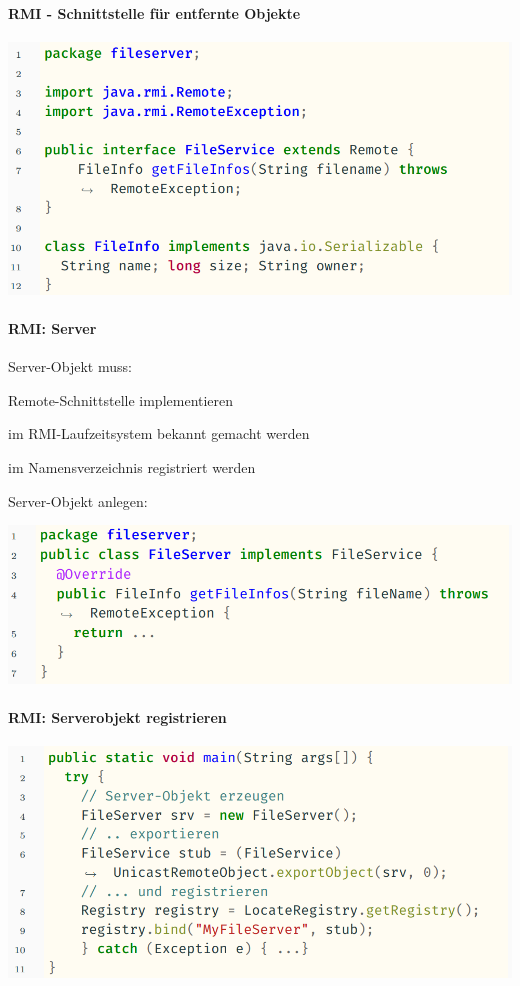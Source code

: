 \documentclass[10pt]{article}
\begin{document}
\paragraph{RMI - Schnittstelle für entfernte Objekte}

\begin{center}
  \includegraphics[width=0.4\linewidth]{Assets/Programmierparadigmen-code-snippet-78}
\end{center}

\paragraph{RMI: Server}

Server-Objekt muss: 
\begin{itemize*}
  \item Remote-Schnittstelle implementieren
  \item im RMI-Laufzeitsystem bekannt gemacht werden
  \item im Namensverzeichnis registriert werden
\end{itemize*}
Server-Objekt anlegen: 
\begin{center}
  \includegraphics[width=0.4\linewidth]{Assets/Programmierparadigmen-code-snippet-79}
\end{center}

\paragraph{RMI: Serverobjekt registrieren}

\begin{center}
  \includegraphics[width=0.4\linewidth]{Assets/Programmierparadigmen-code-snippet-80}
\end{center}
\end{document}
